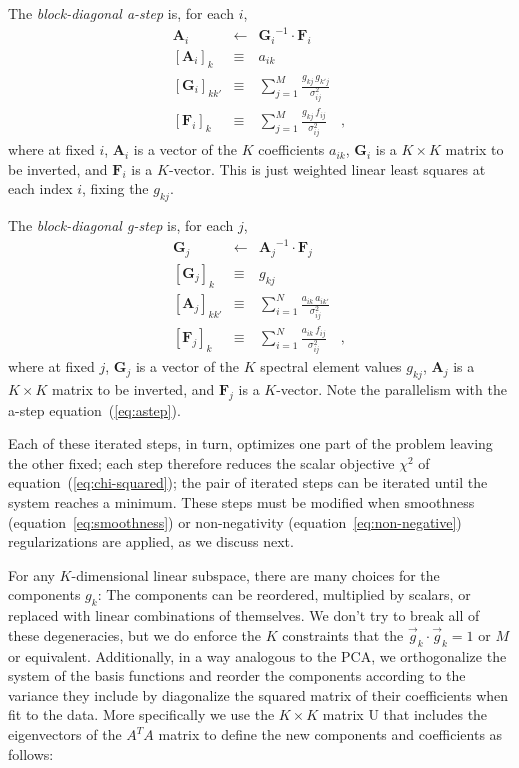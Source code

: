 \documentclass[12pt,preprint]{aastex}
\newcommand{\equationname}{equation}
\newcommand{\tv}[1]{\boldsymbol{#1}}
\newcommand{\inverse}[1]{{#1}^{-1}}
\begin{document}
The \emph{block-diagonal a-step} is, for each $i$,
\begin{eqnarray}\label{eq:astep}\displaystyle
\tv{A}_i & \gets & \inverse{\tv{G}_i}\cdot\tv{F}_i \nonumber\\
\left[\tv{A}_i\right]_k & \equiv & a_{ik} \nonumber\\
\left[\tv{G}_i\right]_{kk'} & \equiv & \sum_{j=1}^{M} \frac{g_{kj}\,g_{k'j}}{\sigma_{ij}^2} \nonumber\\
\left[\tv{F}_i\right]_k     & \equiv & \sum_{j=1}^{M} \frac{g_{kj}\,f_{i j}}{\sigma_{ij}^2}
\quad ,
\end{eqnarray}
where at fixed $i$, $\tv{A}_i$ is a vector of the $K$ coefficients
$a_{ik}$, $\tv{G}_i$ is a $K\times K$ matrix to be inverted, and
$\tv{F}_i$ is a $K$-vector.  This is just weighted linear least
squares at each index $i$, fixing the $g_{kj}$.

The \emph{block-diagonal g-step} is, for each $j$,
\begin{eqnarray}\label{eq:gstep}\displaystyle
\tv{G}_j & \gets & \inverse{\tv{A}_j}\cdot\tv{F}_j \nonumber\\
\left[\tv{G}_j\right]_k & \equiv & g_{kj} \nonumber\\
\left[\tv{A}_j\right]_{kk'} & \equiv & \sum_{i=1}^{N} \frac{a_{ik}\,a_{ik'}}{\sigma_{ij}^2} \nonumber\\
\left[\tv{F}_j\right]_k     & \equiv & \sum_{i=1}^{N} \frac{a_{ik}\,f_{i j}}{\sigma_{ij}^2}
\quad ,
\end{eqnarray}
where at fixed $j$, $\tv{G}_j$ is a vector of the $K$ spectral element
values $g_{kj}$, $\tv{A}_j$ is a $K\times K$ matrix to be inverted, and
$\tv{F}_j$ is a $K$-vector.  Note the parallelism with the a-step
\equationname~(\ref{eq:astep}).

Each of these iterated steps, in turn, optimizes one part of the
problem leaving the other fixed; each step therefore reduces the
scalar objective $\chi^2$ of \equationname~(\ref{eq:chi-squared}); the
pair of iterated steps can be iterated until the system reaches a
minimum.  These steps must be modified when smoothness
(\equationname~\ref{eq:smoothness}) or non-negativity
(\equationname~\ref{eq:non-negative}) regularizations are applied, as
we discuss next.

For any $K$-dimensional linear subspace, there are many choices for
the components $g_k$: The components can be reordered, multiplied by
scalars, or replaced with linear combinations of themselves.  We don't
try to break all of these degeneracies, but we do enforce the $K$
constraints that the $\vec{g}_k\cdot\vec{g}_k=1$ or $M$ or equivalent.
Additionally, in a way analogous to the PCA, we orthogonalize the
system of the basis functions and reorder the components according to
the variance they include by diagonalize the squared matrix of their
coefficients when fit to the data.  More specifically we use the
$K\times K$ matrix U that includes the eigenvectors of the $A^TA$
matrix to define the new components and coefficients as follows:
\end{document}
